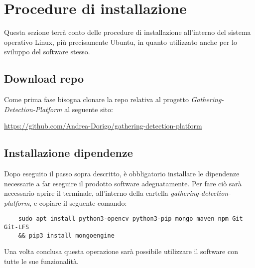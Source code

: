 \chapter{Procedure di installazione}\label{ProceduraDiInstallazione}
Questa sezione terrà conto delle procedure di installazione all'interno del sistema operativo Linux, più precisamente Ubuntu, in quanto utilizzato anche per lo sviluppo del software stesso.

\section{Download repo}\label{ProceduraDiInstallazioneDownloadRepo}
Come prima fase bisogna clonare la repo relativa al progetto \textit{Gathering-Detection-Platform} al seguente sito:
\begin{center}
  \item \url{https://github.com/Andrea-Dorigo/gathering-detection-platform}
\end{center}

\section{Installazione dipendenze}\label{ProceduraDiInstallazioneInstallazioneDipendenze}
Dopo eseguito il passo sopra descritto, è obbligatorio installare le dipendenze necessarie a far eseguire il prodotto software adeguatamente.
Per fare ciò sarà necessario aprire il terminale, all'interno della cartella \textit{gathering-detection-platform}, e copiare il seguente comando:
  \begin{lstlisting}
    sudo apt install python3-opencv python3-pip mongo maven npm Git Git-LFS
    && pip3 install mongoengine
  \end{lstlisting}

Una volta conclusa questa operazione sarà possibile utilizzare il software con tutte le sue funzionalità.

